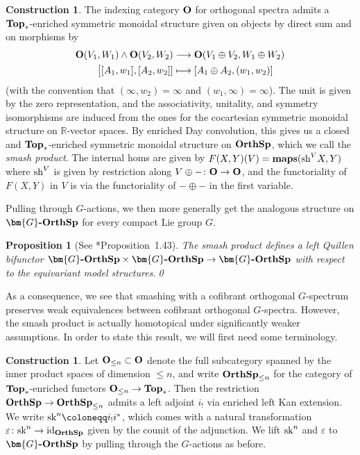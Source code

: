 \documentclass[reqno]{memo-l}
\theoremstyle{mythm}
\newtheorem{prop}[thm]{Proposition}
\theoremstyle{definition}
\newtheorem{constr}[thm]{Construction}
\numberwithin{equation}{section}
\newcommand{\R} {{\mathbb{R}}}
\renewcommand{\epsilon}{\varepsilon}
\newcommand{\sk}{{\textup{sk}}}
\newcommand{\cat}[1]{\textbf{\textup{#1}}}
\newcommand{\maps}{\cat{maps}}
\newcommand{\id}{\textup{id}}
\newcommand{\sh}{{\textup{sh}}}
\let\smashp=\wedge
\newcommand{\osp}{{\textbf{\textup{OrthSp}}}}
\newcommand{\Gosp}[1]{\cat{$\bm{#1}$-OrthSp}}
\begin{document}
\begin{constr}
    The indexing category $\cat{O}$ for orthogonal spectra admits a $\cat{Top}_*$-enriched symmetric monoidal structure given on objects by direct sum and on morphisms by
    \begin{align*}
        \cat{O}(V_1,W_1)\smashp\cat{O}(V_2,W_2)&\longrightarrow\cat{O}(V_1\oplus V_2,W_1\oplus W_2)\\
        \big[[A_1,w_1],[A_2,w_2]]&\longmapsto [A_1\oplus A_2, (w_1,w_2)]
    \end{align*}
    (with the convention that $(\infty,w_2)=\infty$ and $(w_1,\infty)=\infty$). The unit is given by the zero representation, and the associativity, unitality, and symmetry isomorphisms are induced from the ones for the cocartesian symmetric monoidal structure on $\R$-vector spaces. By enriched Day convolution, this gives us a closed and $\cat{Top}_*$-enriched symmetric monoidal structure on $\osp$, which we call the \emph{smash product}. The internal homs are given by $F(X,Y)(V)=\maps(\sh^VX,Y)$ where $\sh^V$ is given by restriction along $V\oplus-\colon\cat{O}\to\cat{O}$, and the functoriality of $F(X,Y)$ in $V$ is via the functoriality of ${-}\oplus{-}$ in the first variable.
    
    Pulling through $G$-actions, we then more generally get the analogous structure on $\Gosp{G}$ for every compact Lie group $G$.
\end{constr}

\begin{prop}[See \cite{DHLPS2019Proper}*{Proposition~1.43}]\label{prop:equiv-smash-sp-left-Quillen-bifunctor}
    The smash product defines a left Quillen bifunctor $\Gosp{G}\times\Gosp{G}\to\Gosp{G}$ with respect to the equivariant model structures.\qed
\end{prop}

As a consequence, we see that smashing with a cofibrant orthogonal $G$-spectrum preserves weak equivalences between cofibrant orthogonal $G$-spectra. However, the smash product is actually homotopical under significantly weaker assumptions. In order to state this result, we will first need some terminology.

\begin{constr}
    Let $\cat{O}_{\le n}\subset\cat{O}$ denote the full subcategory spanned by the inner product spaces of dimension ${}\le n$, and write $\osp_{\le n}$ for the category of $\cat{Top}_*$-enriched functors $\cat{O}_{\le n}\to\cat{Top}_*$. Then the restriction $\osp\to\osp_{\le n}$ admits a left adjoint $i_!$ via enriched left Kan extension. We write $\sk^{n}\coloneqq i_!i^*$, which comes with a natural transformation $\epsilon\colon\sk^n\to\id_{\osp}$ given by the counit of the adjunction. We lift $\sk^n$ and $\epsilon$ to $\Gosp{G}$ by pulling through the $G$-actions as before.
\end{constr}
\end{document}
